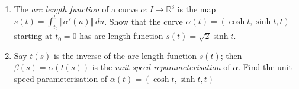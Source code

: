 \documentclass[12 pt, letterpaper]{hmcpset}
\begin{document}
\pagebreak

\begin{problem}[Problem 2.]
	\begin{enumerate}
		\item The \textit{arc length function} of a curve $\alpha : I \to \mathbb{R}^{3}$ is the map $s\left ( t \right ) = \int_{t_{0}}^{t} \left \Vert \alpha'\left ( u \right ) \right \Vert \, du$. Show that the curve $\alpha\left ( t \right ) = \left ( \cosh{t}, \sinh{t}, t \right )$ starting at $t_{0} = 0$ has arc length function $s\left ( t \right ) = \sqrt 2 \sinh{t}$.
		\item Say $t\left ( s \right )$ is the inverse of the arc length function $s\left ( t \right )$; then $\beta\left ( s \right ) = \alpha\left ( t\left ( s \right ) \right )$ is the \textit{unit-speed reparameterisation} of $\alpha$. Find the unit-speed parameterisation of $\alpha\left ( t \right ) = \left ( \cosh{t}, \sinh{t}, t \right )$
	\end{enumerate}
\end{problem}
\end{document}
